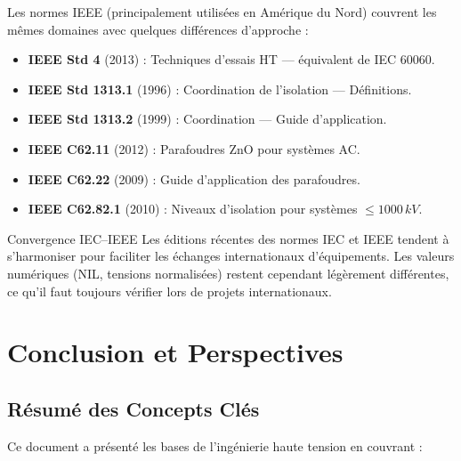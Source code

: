 \documentclass[12pt, a4paper, twoside]{report}
\begin{document}
Les normes IEEE (principalement utilisées en Amérique du Nord) couvrent les mêmes
domaines avec quelques différences d'approche :

\begin{itemize}
  \item \textbf{IEEE Std 4} (2013) : Techniques d'essais HT — équivalent de IEC 60060.
  \item \textbf{IEEE Std 1313.1} (1996) : Coordination de l'isolation — Définitions.
  \item \textbf{IEEE Std 1313.2} (1999) : Coordination — Guide d'application.
  \item \textbf{IEEE C62.11} (2012) : Parafoudres ZnO pour systèmes AC.
  \item \textbf{IEEE C62.22} (2009) : Guide d'application des parafoudres.
  \item \textbf{IEEE C62.82.1} (2010) : Niveaux d'isolation pour systèmes $\leq 1000\,\si{kV}$.
\end{itemize}

\begin{infobox}{Convergence IEC--IEEE}
Les éditions récentes des normes IEC et IEEE tendent à s'harmoniser pour faciliter
les échanges internationaux d'équipements. Les valeurs numériques (NIL, tensions normalisées)
restent cependant légèrement différentes, ce qu'il faut toujours vérifier lors de projets
internationaux.
\end{infobox}

\chapter{Conclusion et Perspectives}

\section{Résumé des Concepts Clés}

Ce document a présenté les bases de l'ingénierie haute tension en couvrant :
\end{document}
